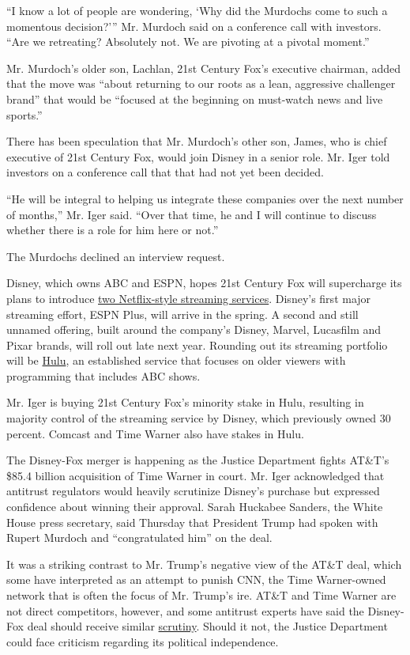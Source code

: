``I know a lot of people are wondering, `Why did the Murdochs come to
such a momentous decision?''' Mr. Murdoch said on a conference call with
investors. ``Are we retreating? Absolutely not. We are pivoting at a
pivotal moment.''

Mr. Murdoch's older son, Lachlan, 21st Century Fox's executive chairman,
added that the move was ``about returning to our roots as a lean,
aggressive challenger brand'' that would be ``focused at the beginning
on must-watch news and live sports.''

There has been speculation that Mr. Murdoch's other son, James, who is
chief executive of 21st Century Fox, would join Disney in a senior role.
Mr. Iger told investors on a conference call that that had not yet been
decided.

``He will be integral to helping us integrate these companies over the
next number of months,'' Mr. Iger said. ``Over that time, he and I will
continue to discuss whether there is a role for him here or not.''

The Murdochs declined an interview request.

Disney, which owns ABC and ESPN, hopes 21st Century Fox will supercharge
its plans to introduce
\href{https://www.nytimes3xbfgragh.onion/2017/10/08/business/media/bamtech-disney-streaming.html}{two
Netflix-style streaming services}. Disney's first major streaming
effort, ESPN Plus, will arrive in the spring. A second and still unnamed
offering, built around the company's Disney, Marvel, Lucasfilm and Pixar
brands, will roll out late next year. Rounding out its streaming
portfolio will be \href{https://www.hulu.com/welcome}{Hulu}, an
established service that focuses on older viewers with programming that
includes ABC shows.

Mr. Iger is buying 21st Century Fox's minority stake in Hulu, resulting
in majority control of the streaming service by Disney, which previously
owned 30 percent. Comcast and Time Warner also have stakes in Hulu.

The Disney-Fox merger is happening as the Justice Department fights
AT\&T's \$85.4 billion acquisition of Time Warner in court. Mr. Iger
acknowledged that antitrust regulators would heavily scrutinize Disney's
purchase but expressed confidence about winning their approval. Sarah
Huckabee Sanders, the White House press secretary, said Thursday that
President Trump had spoken with Rupert Murdoch and ``congratulated him''
on the deal.

It was a striking contrast to Mr. Trump's negative view of the AT\&T
deal, which some have interpreted as an attempt to punish CNN, the Time
Warner-owned network that is often the focus of Mr. Trump's ire. AT\&T
and Time Warner are not direct competitors, however, and some antitrust
experts have said the Disney-Fox deal should receive similar
\href{https://www.nytimes3xbfgragh.onion/2017/12/14/business/media/antitrust-disney-fox.html?hp\&action=click\&pgtype=Homepage\&clickSource=story-heading\&module=first-column-region\&region=top-news\&WT.nav=top-news}{scrutiny}.
Should it not, the Justice Department could face criticism regarding its
political independence.

